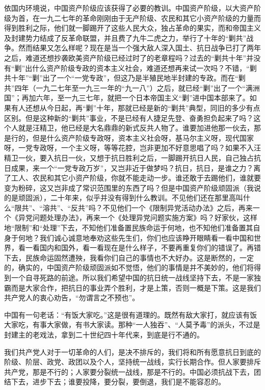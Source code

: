 依国内环境说，中国资产阶级应该获得了必要的教训。中国资产阶级，以大资产阶级为首，在一九二七年的革命刚刚由于无产阶级、农民和其它小资产阶级的力量而得到胜利之际，他们就一脚踢开了这些人民大众，独占革命的果实，而和帝国主义及封建势力结成了反革命联盟，并且费了九牛二虎之力，举行了十年的“剿共”战争。然而结果又怎么样呢？现在是当一个强大敌人深入国土、抗日战争已打了两年之后，难道还想抄袭欧美资产阶级已经过时了的老章程吗？过去的“剿共十年”并没有“剿”出什么资产阶级专政的资本主义社会，难道还想再来试一次吗？不错，“剿共十年”“剿”出了一个“一党专政”，但这乃是半殖民地半封建的专政。而在“剿共”四年（一九二七年至一九三一年的“九一八”）之后，就已经“剿”出了一个“满洲国”；再加六年，至一九三七年，就把一个日本帝国主义“剿”进中国本部来了。如果有人还想从今日起，再“剿”十年，那就已经是新的“剿共”典型，同旧的多少有点区别。但是这种新的“剿共”事业，不是已经有人捷足先登、奋勇担负起来了吗？这个人就是汪精卫，他已经是大名鼎鼎的新式反共人物了。谁要加进他那一伙去，那是行的，但是什么资产阶级专政呀，资本主义社会呀，基马尔主义呀，现代国家呀，一党专政呀，一个主义呀，等等花腔，岂非更加不好意思唱了吗？如果不入汪精卫一伙，要入抗日一伙，又想于抗日胜利之后，一脚踢开抗日人民，自己独占抗日成果，来一个“一党专政万岁”，又岂非近于做梦吗？抗日，抗日，是谁之力？离了工人、农民和其它小资产阶级，你就不能走动一步。谁还敢于去踢他们，谁就要变为粉碎，这又岂非成了常识范围里的东西了吗？但是中国资产阶级顽固派（我说的是顽固派），二十年来，似乎并没有得到什么教训。不见他们还在那里高叫什么“限共”、“溶共”、“反共”吗？不见他们一个《限制异党活动办法》之后，再来一个《异党问题处理办法》，再来一个《处理异党问题实施方案》吗？好家伙，这样地“限制”和“处理”下去，不知他们准备置民族命运于何地，也不知他们准备置其自身于何地？我们诚心诚意地奉劝这些先生们，你们也应该睁开眼睛看一看中国和世界，看一看国内和国外，看一看现在是什么样子，不要再重复你们的错误了。再错下去，民族命运固然遭殃，我看你们自己的事情也不大好办。这是断然的，一定的，确实的，中国资产阶级顽固派如不觉悟，他们的事情是并不美妙的，他们将得到一个自寻死路的前途。所以我们希望中国的抗日统一战线坚持下去，不是一家独霸而是大家合作，把抗日的事业弄个胜利，才是上策，否则一概是下策。这是我们共产党人的衷心劝告，“勿谓言之不预也”。

中国有一句老话：“有饭大家吃。”这是很有道理的。既然有敌大家打，就应该有饭大家吃，有事大家做，有书大家读。那种“一人独吞”、“人莫予毒”的派头，不过是封建主的老戏法，拿到二十世纪四十年代来，到底是行不通的。

我们共产党人对于一切革命的人们，是决不排斥的，我们将和所有愿意抗日到底的阶级、阶层、政党、政团以及个人，坚持统一战线，实行长期合作。但人家要排斥共产党，那是不行的；人家要分裂统一战线，那是不行的。中国必须抗战下去，团结下去，进步下去；谁要投降，要分裂，要倒退，我们是不能容忍的。

